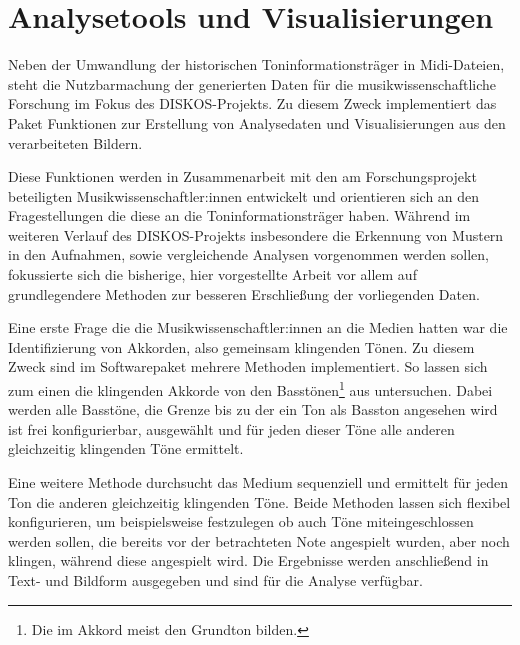 \FloatBarrier
\section{Analysetools und Visualisierungen}

Neben der Umwandlung der historischen Toninformationsträger in Midi-Dateien, steht die Nutzbarmachung der generierten Daten für die musikwissenschaftliche Forschung im Fokus des DISKOS-Projekts.
Zu diesem Zweck implementiert das  Paket Funktionen zur Erstellung von Analysedaten und Visualisierungen aus den verarbeiteten Bildern.

Diese Funktionen werden in Zusammenarbeit mit den am Forschungsprojekt beteiligten Musikwissenschaftler:innen entwickelt und orientieren sich an den Fragestellungen die diese an die Toninformationsträger haben.
Während im weiteren Verlauf des DISKOS-Projekts insbesondere die Erkennung von Mustern in den Aufnahmen, sowie vergleichende Analysen vorgenommen werden sollen, fokussierte sich die bisherige, hier vorgestellte Arbeit vor allem auf grundlegendere Methoden zur besseren Erschließung der vorliegenden Daten.

Eine erste Frage die die Musikwissenschaftler:innen an die Medien hatten war die Identifizierung von Akkorden, also gemeinsam klingenden Tönen.
Zu diesem Zweck sind im Softwarepaket mehrere Methoden implementiert.
So lassen sich zum einen die klingenden Akkorde von den Basstönen\footnote{Die im Akkord meist den Grundton bilden.} aus untersuchen.
Dabei werden alle Basstöne, die Grenze bis zu der ein Ton als Basston angesehen wird ist frei konfigurierbar, ausgewählt und für jeden dieser Töne alle anderen gleichzeitig klingenden Töne ermittelt.

Eine weitere Methode durchsucht das Medium sequenziell und ermittelt für jeden Ton die anderen gleichzeitig klingenden Töne.
Beide Methoden lassen sich flexibel konfigurieren, um beispielsweise festzulegen ob auch Töne miteingeschlossen werden sollen, die bereits vor der betrachteten Note angespielt wurden, aber noch klingen, während diese angespielt wird.
Die Ergebnisse werden anschließend in Text- und Bildform ausgegeben und sind für die Analyse verfügbar.

